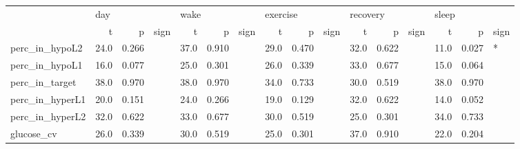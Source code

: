 \begin{tabular}{lrrlrrlrrlrrlrrl}
\toprule
{} & \multicolumn{3}{l}{day} & \multicolumn{3}{l}{wake} & \multicolumn{3}{l}{exercise} & \multicolumn{3}{l}{recovery} & \multicolumn{3}{l}{sleep} \\
{} &     t &      p & sign &     t &      p & sign &        t &      p & sign &        t &      p & sign &     t &      p & sign \\
\midrule
perc_in_hypoL2  &  24.0 &  0.266 &      &  37.0 &  0.910 &      &     29.0 &  0.470 &      &     32.0 &  0.622 &      &  11.0 &  0.027 &    * \\
perc_in_hypoL1  &  16.0 &  0.077 &      &  25.0 &  0.301 &      &     26.0 &  0.339 &      &     33.0 &  0.677 &      &  15.0 &  0.064 &      \\
perc_in_target  &  38.0 &  0.970 &      &  38.0 &  0.970 &      &     34.0 &  0.733 &      &     30.0 &  0.519 &      &  38.0 &  0.970 &      \\
perc_in_hyperL1 &  20.0 &  0.151 &      &  24.0 &  0.266 &      &     19.0 &  0.129 &      &     32.0 &  0.622 &      &  14.0 &  0.052 &      \\
perc_in_hyperL2 &  32.0 &  0.622 &      &  33.0 &  0.677 &      &     30.0 &  0.519 &      &     25.0 &  0.301 &      &  34.0 &  0.733 &      \\
glucose_cv      &  26.0 &  0.339 &      &  30.0 &  0.519 &      &     25.0 &  0.301 &      &     37.0 &  0.910 &      &  22.0 &  0.204 &      \\
\bottomrule
\end{tabular}
